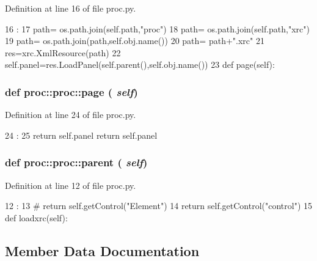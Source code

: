 Definition at line 16 of file proc.py.


\begin{DoxyCode}
16                      :
17         path= os.path.join(self.path,"proc")
18         path= os.path.join(self.path,"xrc")
19         path= os.path.join(path,self.obj.name())
20         path= path+".xrc"
21         res=xrc.XmlResource(path)
22         self.panel=res.LoadPanel(self.parent(),self.obj.name())
23         
    def page(self):
\end{DoxyCode}
\hypertarget{classproc_1_1proc_ac70ada08e4fc982a3e61e9ee77b247bf}{
\subsubsection[{page}]{\setlength{\rightskip}{0pt plus 5cm}def proc::proc::page ( {\em self})}}
\label{classproc_1_1proc_ac70ada08e4fc982a3e61e9ee77b247bf}


Definition at line 24 of file proc.py.


\begin{DoxyCode}
24                   :
25         return self.panel
        return self.panel
\end{DoxyCode}
\hypertarget{classproc_1_1proc_a73ad55427f28a79ef0483e18ce996e14}{
\subsubsection[{parent}]{\setlength{\rightskip}{0pt plus 5cm}def proc::proc::parent ( {\em self})}}
\label{classproc_1_1proc_a73ad55427f28a79ef0483e18ce996e14}


Definition at line 12 of file proc.py.


\begin{DoxyCode}
12                     :
13 #        return self.getControl("Element")   
14         return self.getControl("control")
15 
    def loadxrc(self):
\end{DoxyCode}


\subsection{Member Data Documentation}
\hypertarget{classobject_1_1object_a4fbaf843d1f40843b2c3895cb73ffada}{
\subsubsection[{cat}]{}}
\label{classobject_1_1object_a4fbaf843d1f40843b2c3895cb73ffada}


